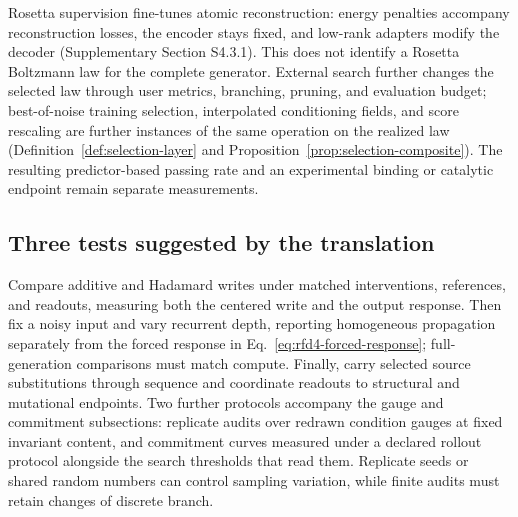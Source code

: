 Rosetta supervision fine-tunes atomic reconstruction: energy penalties accompany reconstruction
losses, the encoder stays fixed, and low-rank adapters modify the decoder (Supplementary
Section S4.3.1).  This does not identify a Rosetta Boltzmann law for the complete generator.
External search further changes the selected law through user metrics, branching, pruning, and
evaluation budget; best-of-noise training selection, interpolated conditioning fields, and score
rescaling are further instances of the same operation on the realized law
(Definition~\ref{def:selection-layer} and Proposition~\ref{prop:selection-composite}).  The
resulting predictor-based passing rate and an experimental binding or catalytic endpoint remain
separate measurements.

\subsection{Three tests suggested by the translation}

Compare additive and Hadamard writes under matched interventions, references, and readouts,
measuring both the centered write and the output response.  Then fix a noisy input and vary
recurrent depth, reporting homogeneous propagation separately from the forced response in
Eq.~\ref{eq:rfd4-forced-response}; full-generation comparisons must match compute.
Finally, carry selected source substitutions through sequence and coordinate readouts to
structural and mutational endpoints.  Two further protocols accompany the gauge and commitment
subsections: replicate audits over redrawn condition gauges at fixed invariant content, and
commitment curves measured under a declared rollout protocol alongside the search thresholds
that read them.  Replicate seeds or shared random numbers can control sampling variation, while
finite audits must retain changes of discrete branch.
